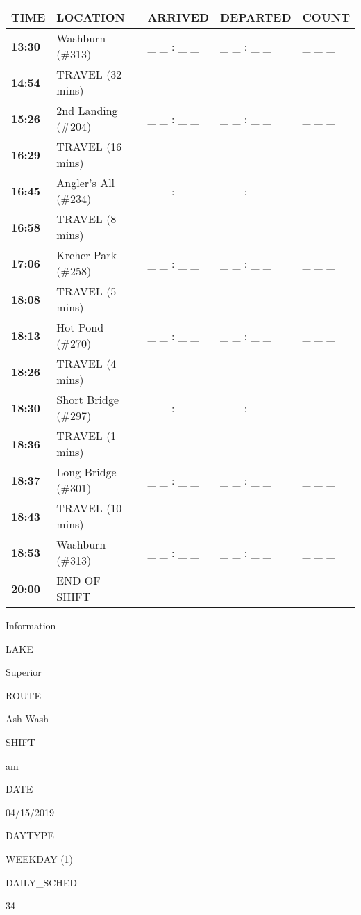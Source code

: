 \documentclass[]{article}
\begin{document}
\begin{tabular}{>{\bfseries}lllll}
\toprule
\textbf{TIME} & \textbf{LOCATION} & \textbf{ARRIVED} & \textbf{DEPARTED} & \textbf{COUNT}\\
\midrule
13:30 & Washburn (\#313) & \_ \_ : \_ \_ & \_ \_ : \_ \_ & \_ \_ \_\\
14:54 & TRAVEL (32 mins) &  &  & \\
15:26 & 2nd Landing (\#204) & \_ \_ : \_ \_ & \_ \_ : \_ \_ & \_ \_ \_\\
16:29 & TRAVEL (16 mins) &  &  & \\
16:45 & Angler's All (\#234) & \_ \_ : \_ \_ & \_ \_ : \_ \_ & \_ \_ \_\\
16:58 & TRAVEL (8 mins) &  &  & \\
17:06 & Kreher Park (\#258) & \_ \_ : \_ \_ & \_ \_ : \_ \_ & \_ \_ \_\\
18:08 & TRAVEL (5 mins) &  &  & \\
18:13 & Hot Pond (\#270) & \_ \_ : \_ \_ & \_ \_ : \_ \_ & \_ \_ \_\\
18:26 & TRAVEL (4 mins) &  &  & \\
18:30 & Short Bridge (\#297) & \_ \_ : \_ \_ & \_ \_ : \_ \_ & \_ \_ \_\\
18:36 & TRAVEL (1 mins) &  &  & \\
18:37 & Long Bridge (\#301) & \_ \_ : \_ \_ & \_ \_ : \_ \_ & \_ \_ \_\\
18:43 & TRAVEL (10 mins) &  &  & \\
18:53 & Washburn (\#313) & \_ \_ : \_ \_ & \_ \_ : \_ \_ & \_ \_ \_\\
20:00 & END OF SHIFT &  &  & \\
\bottomrule
\end{tabular}\newpage

Information

LAKE

Superior

ROUTE

Ash-Wash

SHIFT

am

DATE

04/15/2019

DAYTYPE

WEEKDAY (1)

DAILY\_SCHED

34

\vspace{24pt}
\end{document}
